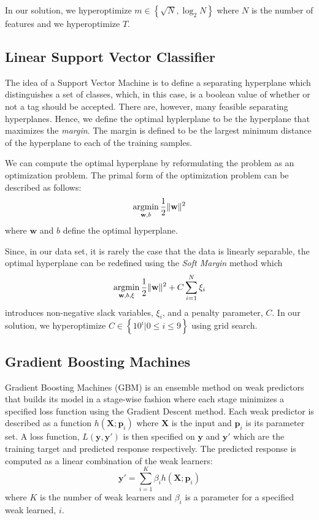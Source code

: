 \documentclass{sig-alternate}
\newcommand{\argmin}{\operatornamewithlimits{argmin}}
\renewcommand{\vec}[1]{\mathbf{#1}}
\begin{document}
	In our solution, we hyperoptimize $m \in \left\{\sqrt{N},
	\log_2{N}\right\}$ where $N$ is the number of features and we hyperoptimize
	$T$.

	\subsection{Linear Support Vector Classifier} %
	\label{sub:Linear Support Vector Classifier}

	The idea of a Support Vector Machine is to define a separating hyperplane
	which distinguishes a set of classes, which, in this case, is a boolean
	value of whether or not a tag should be accepted. There are, however,
	many feasible separating hyperplanes. Hence, we define the optimal
	hyplerplane to be the hyperplane that maximizes the \emph{margin}.  The
	margin is defined to be the largest minimum distance of the hyperplane to
	each of the training samples.

	We can compute the optimal hyperplane by reformulating the problem as an
	optimization problem. The primal form of the optimization problem can be
	described as follows:
	\[
		\argmin_{\vec{w}, b} \frac{1}{2}\|\vec{w}\|^2
	\]
	where $\vec{w}$ and $b$ define the optimal hyperplane.

	Since, in our data set, it is rarely the case that the data is linearly
	separable, the optimal hyperplane can be redefined using the \emph{Soft
	Margin} method which 
	\[
		\argmin_{\vec{w}, b, \vec{\xi}} \frac{1}{2}\|\vec{w}\|^2 + C\sum_{i=1}^N \xi_i
	\]
	introduces non-negative slack variables, $\xi_i$, and a penalty parameter,
	$C$. In our solution, we hyperoptimize $C \in \left\{10^i | 0 \leq i
	\leq 9\right\}$ using grid search.


	\subsection{Gradient Boosting Machines} %
	\label{sub:Gradient Boosting}

	Gradient Boosting Machines (GBM) is an ensemble method on weak predictors
	that builds its model in a stage-wise fashion where each stage minimizes a
	specified loss function using the Gradient Descent method. Each weak
	predictor is described as a function $h(\vec{X};\vec{p}_i)$ where $\vec{X}$
	is the input and $\vec{p}_i$ is its parameter set. A loss function, $L(\vec{y}, \vec{y}')$
	is then specified on $\vec{y}$ and $\vec{y}'$ which are the training target and
	predicted response respectively. The predicted response is computed as a linear
	combination of the weak learners:
	\[
		\vec{y}' = \sum_{i=1}^K \beta_i h(\vec{X}; \vec{p}_i)
	\]
	where $K$ is the number of weak learners and $\beta_i$ is a parameter for a
	specified weak learned, $i$.
\end{document}
